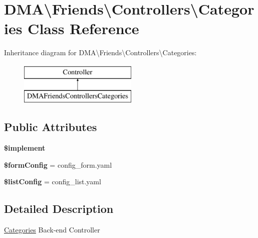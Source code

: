 \hypertarget{classDMA_1_1Friends_1_1Controllers_1_1Categories}{}\section{D\+M\+A\textbackslash{}Friends\textbackslash{}Controllers\textbackslash{}Categories Class Reference}
\label{classDMA_1_1Friends_1_1Controllers_1_1Categories}
Inheritance diagram for D\+M\+A\textbackslash{}Friends\textbackslash{}Controllers\textbackslash{}Categories\+:\begin{figure}[H]
\begin{center}
\leavevmode
\includegraphics[height=2.000000cm]{d9/daa/classDMA_1_1Friends_1_1Controllers_1_1Categories}
\end{center}
\end{figure}
\subsection*{Public Attributes}
\begin{DoxyCompactItemize}
\item 
{\bfseries \$implement}
\item 
\hypertarget{classDMA_1_1Friends_1_1Controllers_1_1Categories_a7703e05040f63ca4879a67fa7f012505}{}{\bfseries \$form\+Config} = \textquotesingle{}config\+\_\+form.\+yaml\textquotesingle{}\label{classDMA_1_1Friends_1_1Controllers_1_1Categories_a7703e05040f63ca4879a67fa7f012505}

\item 
\hypertarget{classDMA_1_1Friends_1_1Controllers_1_1Categories_a582b40a4ad8ec8bc87d37f6de0a79281}{}{\bfseries \$list\+Config} = \textquotesingle{}config\+\_\+list.\+yaml\textquotesingle{}\label{classDMA_1_1Friends_1_1Controllers_1_1Categories_a582b40a4ad8ec8bc87d37f6de0a79281}

\end{DoxyCompactItemize}


\subsection{Detailed Description}
\hyperlink{classDMA_1_1Friends_1_1Controllers_1_1Categories}{Categories} Back-\/end Controller 

